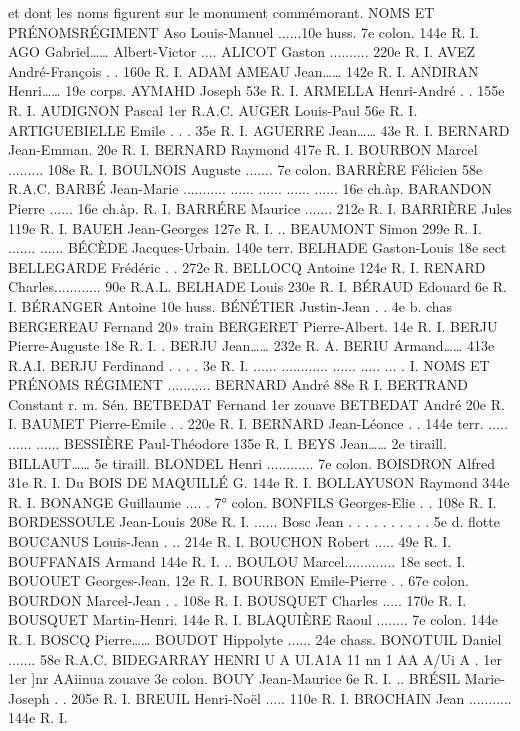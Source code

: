 \documentclass[a4paper,11pt]{book}
\begin{document}
et dont les noms figurent sur le monument commémorant.
NOMS ET PRÉNOMSRÉGIMENT
Aso Louis-Manuel ......10e huss.
7e colon.
144e R. I.
AGO Gabriel……
Albert-Victor ....
ALICOT Gaston .......... 220e R. I.
AVEZ André-François . . 160e R. I.
ADAM
AMEAU Jean……
142e R. I.
ANDIRAN Henri……
19e corps.
AYMAHD Joseph
53e R. I.
ARMELLA Henri-André . . 155e R. I.
AUDIGNON Pascal
1er R.A.C.
AUGER Louis-Paul
56e R. I.
ARTIGUEBIELLE Emile . . . 35e R. I.
AGUERRE Jean……
43e R. I.
BERNARD
Jean-Emman. 20e R. I.
BERNARD Raymond
417e R. I.
BOURBON Marcel ......... 108e R. I.
BOULNOIS Auguste ....... 7e colon.
BARRÈRE Félicien
58e R.A.C.
BARBÉ Jean-Marie
...........
......
......
......
...... 16e ch.àp.
BARANDON
Pierre ......
16e
ch.àp.
R. I.
BARRÉRE Maurice ....... 212e R. I.
BARRIÈRE Jules
119e R. I.
BAUEH Jean-Georges
127e R. I.
..
BEAUMONT Simon
299e R. I.
.......
......
BÉCÈDE Jacques-Urbain. 140e
terr.
BELHADE Gaston-Louis
18e sect
BELLEGARDE Frédéric . . 272e R.
BELLOCQ Antoine
124e R. I.
RENARD Charles............ 90e R.A.L.
BELHADE Louis
230e R. I.
BÉRAUD Edouard
6e R. I.
BÉRANGER Antoine
10e huss.
BÉNÉTIER Justin-Jean . . 4e b. chas
BERGEREAU Fernand
20» train
BERGERET Pierre-Albert. 14e R. I.
BERJU Pierre-Auguste
18e R. I.
.
BERJU Jean……
232e R. A.
BERIU Armand……
413e R.A.I.
BERJU Ferdinand . . . . 3e R. I.
......
............
......
.....
...
.
I.
NOMS ET PRÉNOMS
RÉGIMENT
...........
BERNARD André
88e R I.
BERTRAND Constant
r. m. Sén.
BETBEDAT Fernand
1er zouave
BETBEDAT André
20e R. I.
BAUMET Pierre-Emile . . 220e R. I.
BERNARD Jean-Léonce . . 144e terr.
.....
......
......
BESSIÈRE Paul-Théodore 135e R. I.
BEYS Jean……
2e tiraill.
BILLAUT……
5e tiraill.
BLONDEL Henri ............ 7e colon.
BOISDRON Alfred
31e R. I.
Du BOIS DE MAQUILLÉ G. 144e R. I.
BOLLAYUSON Raymond
344e R. I.
BONANGE Guillaume .... . 7° colon.
BONFILS Georges-Elie . . 108e R. I.
BORDESSOULE Jean-Louis 208e R. I.
......
Bosc Jean . . . . . . . . . . 5e d. flotte
BOUCANUS Louis-Jean . .. 214e R. I.
BOUCHON Robert ..... 49e R. I.
BOUFFANAIS Armand
144e R. I.
..
BOULOU Marcel............. 18e sect. I.
BOUOUET Georges-Jean. 12e R. I.
BOURBON Emile-Pierre . . 67e colon.
BOURDON Marcel-Jean . . 108e R. I.
BOUSQUET Charles ..... 170e R. I.
BOUSQUET Martin-Henri. 144e R. I.
BLAQUIÈRE Raoul ........ 7e colon.
144e R. I.
BOSCQ Pierre……
BOUDOT Hippolyte ...... 24e chass.
BONOTUIL Daniel ....... 58e R.A.C.
BIDEGARRAY HENRI
U A UI.A1A 11 nn 1
AA A/Ui A
. 1er
1er
]nr AAiinua
zouave
3e colon.
BOUY Jean-Maurice
6e R. I.
..
BRÉSIL Marie-Joseph . . 205e R. I.
BREUIL Henri-Noël ..... 110e R. I.
BROCHAIN Jean ........... 144e R. I.
\end{document}
